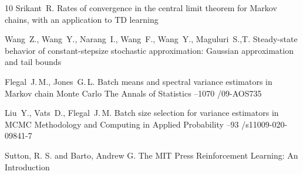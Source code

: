 \documentclass[blind]{psta}
\begin{document}
\begin{thebibliography}{10}
\by Srikant~R.
\paper Rates of convergence in the central limit theorem for Markov chains,
with an application to TD learning

\by Wang~Z., Wang~Y., Narang~I., Wang~F., Wang~Y., Maguluri~S.,T.
\paper Steady-state behavior of constant-stepsize stochastic approximation:
Gaussian approximation and tail bounds

\by Flegal~J.\,M., Jones~G.\,L.
\paper Batch means and spectral variance estimators in Markov chain Monte
Carlo
\jour The Annals of Statistics
--1070
/09-AOS735

\by Liu~Y., Vats~D., Flegal~J.\,M.
\paper Batch size selection for variance estimators in MCMC
\jour Methodology and Computing in Applied Probability
--93
/s11009-020-09841-7

\by Sutton, R. S. and Barto, Andrew G.
\jour The MIT Press
\paper Reinforcement Learning: An Introduction

\end{thebibliography}

\makefinish

\English
\maketitle
\end{document}
